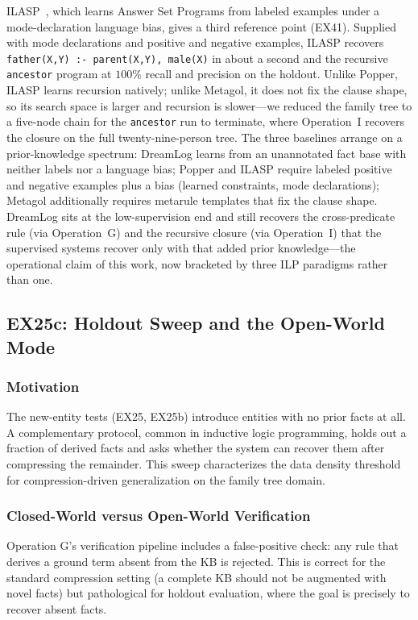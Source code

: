 \documentclass[10pt,conference]{IEEEtran}
\begin{document}
ILASP~\cite{law2014ilasp}, which learns Answer Set Programs from labeled examples under a mode-declaration language bias, gives a third reference point (EX41). Supplied with mode declarations and positive and negative examples, ILASP recovers \texttt{father(X,Y) :- parent(X,Y), male(X)} in about a second and the recursive \texttt{ancestor} program at $100\%$ recall and precision on the holdout. Unlike Popper, ILASP learns recursion natively; unlike Metagol, it does not fix the clause shape, so its search space is larger and recursion is slower---we reduced the family tree to a five-node chain for the \texttt{ancestor} run to terminate, where Operation~I recovers the closure on the full twenty-nine-person tree. The three baselines arrange on a prior-knowledge spectrum: DreamLog learns from an unannotated fact base with neither labels nor a language bias; Popper and ILASP require labeled positive and negative examples plus a bias (learned constraints, mode declarations); Metagol additionally requires metarule templates that fix the clause shape. DreamLog sits at the low-supervision end and still recovers the cross-predicate rule (via Operation~G) and the recursive closure (via Operation~I) that the supervised systems recover only with that added prior knowledge---the operational claim of this work, now bracketed by three ILP paradigms rather than one.

\subsection{EX25c: Holdout Sweep and the Open-World Mode}
\label{sec:ex25c}

\subsubsection{Motivation}
The new-entity tests (EX25, EX25b) introduce entities with no prior facts at all. A complementary protocol, common in inductive logic programming, holds out a fraction of derived facts and asks whether the system can recover them after compressing the remainder. This sweep characterizes the data density threshold for compression-driven generalization on the family tree domain.

\subsubsection{Closed-World versus Open-World Verification}
Operation G's verification pipeline includes a false-positive check: any rule that derives a ground term absent from the KB is rejected. This is correct for the standard compression setting (a complete KB should not be augmented with novel facts) but pathological for holdout evaluation, where the goal is precisely to recover absent facts.
\end{document}
